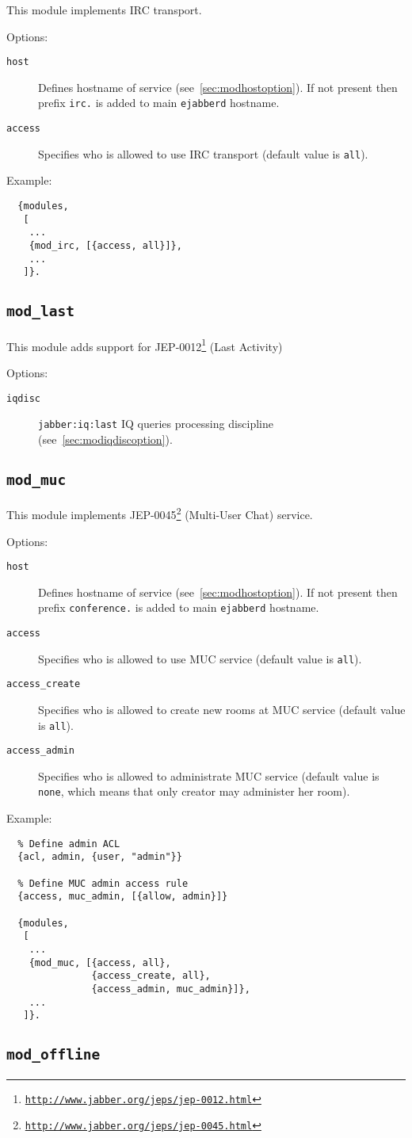 \documentclass[a4paper,10pt]{article}
\newcommand{\bracehack}{\def\{{\char"7B}\def\}{\char"7D}}
\newcommand{\ns}[1]{\texttt{#1}}
\newcommand{\jid}[1]{\texttt{#1}}
\newcommand{\term}[1]{\texttt{#1}}
\newcommand{\ejabberd}{\texttt{ejabberd}}
\newcommand{\module}[1]{\texttt{#1}}
\newcommand{\modlast}{\module{mod\_last}}
\newcommand{\modmuc}{\module{mod\_muc}}
\newcommand{\modoffline}{\module{mod\_offline}}
\newcommand{\titem}[1]{\item[\bracehack\texttt{#1}]}
\gdef\footahref#1#2{#2\footnote{\href{#1}{\texttt{#1}}}}
\newcommand{\tjepref}[2]{\footahref{http://www.jabber.org/jeps/jep-#1.html}{#2}}
\newcommand{\jepref}[1]{\tjepref{#1}{JEP-#1}}
\newcommand{\iqdiscitem}[1]{\titem{iqdisc} #1 IQ queries processing
discipline (see~\ref{sec:modiqdiscoption}).}
\newcommand{\hostitem}[1]{\titem{host} Defines hostname of service
(see~\ref{sec:modhostoption}). If not present
then prefix \jid{#1.} is added to main \ejabberd{} hostname.}
\begin{document}
This module implements IRC transport.

Options:
\begin{description}
\hostitem{irc}
\titem{access} Specifies who is allowed to use IRC transport (default value is \term{all}).
\end{description}

Example:
\begin{verbatim}
  {modules,
   [
    ...
    {mod_irc, [{access, all}]},
    ...
   ]}.
\end{verbatim}


\subsection{\modlast{}}
\label{sec:modlast}

This module adds support for \jepref{0012} (Last Activity)

Options:
\begin{description}
\iqdiscitem{\ns{jabber:iq:last}}
\end{description}


\subsection{\modmuc{}}
\label{sec:modmuc}

This module implements \jepref{0045} (Multi-User Chat) service.

Options:
\begin{description}
\hostitem{conference}
\titem{access} Specifies who is allowed to use MUC service (default value is \term{all}).
\titem{access\_create} Specifies who is allowed to create new rooms at
  MUC service (default value is \term{all}).
\titem{access\_admin} Specifies who is allowed to administrate MUC service
(default value is \term{none}, which means that only creator may administer her room).
\end{description}

Example:
\begin{verbatim}
  % Define admin ACL
  {acl, admin, {user, "admin"}}

  % Define MUC admin access rule
  {access, muc_admin, [{allow, admin}]}

  {modules,
   [
    ...
    {mod_muc, [{access, all},
               {access_create, all},
               {access_admin, muc_admin}]},
    ...
   ]}.
\end{verbatim}


\subsection{\modoffline{}}
\label{sec:modoffline}
\end{document}
